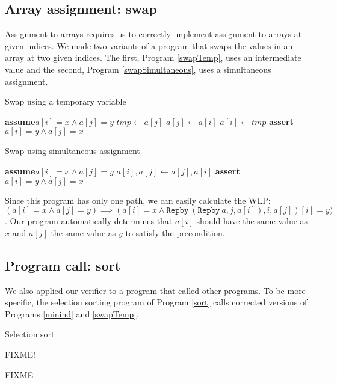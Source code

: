 \documentclass[a4paper]{article}
\newcommand{\Assert}{\State\textbf{assert}\xspace}
\newcommand{\Assume}{\State\textbf{assume}\xspace}
\begin{document}
\subsection{Array assignment: swap}

Assignment to arrays requires us to correctly implement assignment to arrays at given indices. We made two variants of a program that swaps the values in an array at two given indices. The first, Program \ref{swapTemp}, uses an intermediate value and the second, Program \ref{swapSimultaneous}, uses a simultaneous assignment.

\begin{algorithm}\label{swapTemp}
\caption{Swap using a temporary variable}
\begin{algorithmic}
\Assume $a[i] = x \wedge a[j] = y$
\State $\textit{tmp} \gets a[j]$
\State $a[j] \gets a[i]$
\State $a[i] \gets \textit{tmp}$
\EndVar
\Assert $a[i] = y \wedge a[j] = x$
\end{algorithmic}
\end{algorithm}

\begin{algorithm}\label{swapSimultaneous}
\caption{Swap using simultaneous assignment}
\begin{algorithmic}
\Assume $a[i] = x \wedge a[j] = y$
\State $a[i], a[j] \gets a[j], a[i]$
\Assert $a[i] = y \wedge a[j] = x$
\end{algorithmic}
\end{algorithm}

Since this program has only one path, we can easily calculate the WLP: $(a[i] = x \wedge a[j] = y) \implies (a[i] = x \wedge \texttt{Repby}\ (\texttt{Repby}\ a, j, a[i]), i, a[j])[i] = y)$. Our program automatically determines that $a[i]$ should have the same value as $x$ and $a[j]$ the same value as $y$ to satisfy the precondition.

\subsection{Program call: sort}

We also applied our verifier to a program that called other programs. To be more specific, the selection sorting program of Program \ref{sort} calls corrected versions of Programs \ref{minind} and \ref{swapTemp}.

\begin{algorithm}\label{sort}
\caption{Selection sort}
\begin{algorithmic}
FIXME!
\end{algorithmic}
\end{algorithm}
FIXME
\end{document}
